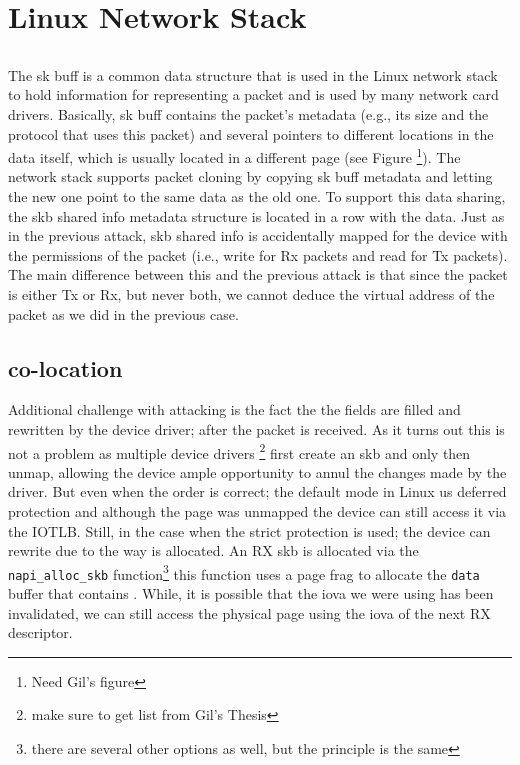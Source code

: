 \section{Linux Network Stack}

\subsection{\shinfo}
The sk buff is a common data structure that is used in the Linux network stack to
hold information for representing a packet and is used by many network card drivers.
Basically, sk buff contains the packet’s metadata (e.g., its size and the protocol that
uses this packet) and several pointers to different locations in the data itself, which is usually located in a different page (see Figure \footnote{Need Gil's figure}). The network stack supports packet
cloning by copying sk buff metadata and letting the new one point to the same data
as the old one. To support this data sharing, the skb shared info metadata structure
is located in a row with the data. Just as in the previous attack, skb shared info is
accidentally mapped for the device with the permissions of the packet (i.e., write for Rx
packets and read for Tx packets).
The main difference between this and the previous attack is that since the packet is
either Tx or Rx, but never both, we cannot deduce the virtual address of the packet as we did in the previous case.
\subsection{\shinfo co-location}
Additional challenge with attacking \shinfo is the fact the the fields are filled and rewritten by the device driver; after the packet is received. As it turns out this is not a problem as multiple device drivers \footnote{make sure to get list from Gil's Thesis} first create an skb and only then unmap, allowing the device ample opportunity to annul the changes made by the driver. But even when the order is correct; the default mode in Linux us deferred protection and although the page was unmapped the device can still access it via the IOTLB. Still, in the case when the strict protection is used; the device can rewrite \shinfo due to the way \shinfo is allocated. An RX skb is allocated via the \texttt{napi\_alloc\_skb} function\footnote{there are several other options as well, but the principle is the same} this function uses a page frag to allocate the \texttt{data} buffer that contains \shinfo. While, it is possible that the iova we were using has been invalidated, we can still access the physical page using the iova of the next RX descriptor.

